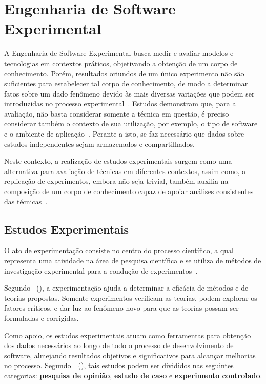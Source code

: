 \chapter{Engenharia de Software Experimental}
\label{cp:engenharia}

A Engenharia de Software Experimental busca medir e avaliar modelos e tecnologias em contextos práticos, objetivando a obtenção de um corpo de conhecimento. Porém, resultados oriundos de um único experimento não são suficientes para estabelecer tal corpo de conhecimento, de modo a determinar fatos sobre um dado fenômeno devido às mais diversas variações que podem ser introduzidas no processo experimental~\cite{Basili99, Miller:2005, Shull03}. Estudos demonstram que, para a avaliação, não basta considerar somente a técnica em questão, é preciso considerar também o contexto de sua utilização, por exemplo, o tipo de software e o ambiente de aplicação~\cite{carver2004impact}. Perante a isto, se faz necessário que dados sobre estudos independentes sejam armazenados e compartilhados.

Neste contexto, a realização de estudos experimentais surgem como uma alternativa para avaliação de técnicas em diferentes contextos, assim como, a replicação de experimentos, embora não seja trivial, também auxilia na composição de um corpo de conhecimento capaz de apoiar análises consistentes das técnicas~\cite{Shull02}.

\section{Estudos Experimentais}
O ato de experimentação consiste no centro do processo científico, a qual representa uma atividade na área de pesquisa científica e se utiliza de métodos de investigação experimental para a condução de experimentos~\cite{Travassos02}. 

Segundo ~(\citeyear{Basili99}), a experimentação ajuda a determinar a eficácia de métodos e de teorias propostas. Somente experimentos verificam as teorias, podem explorar os fatores críticos, e dar luz ao fenômeno novo para que as teorias possam ser formuladas e corrigidas.

Como apoio, os estudos experimentais atuam como ferramentas para obtenção dos dados necessários ao longo de todo o processo de desenvolvimento de software, almejando resultados objetivos e significativos para alcançar melhorias no processo. Segundo~~(\citeyear{Wohlin2012}), tais estudos podem ser divididos nas seguintes categorias: \textbf{pesquisa de opinião}, \textbf{estudo de caso} e \textbf{experimento controlado}.

